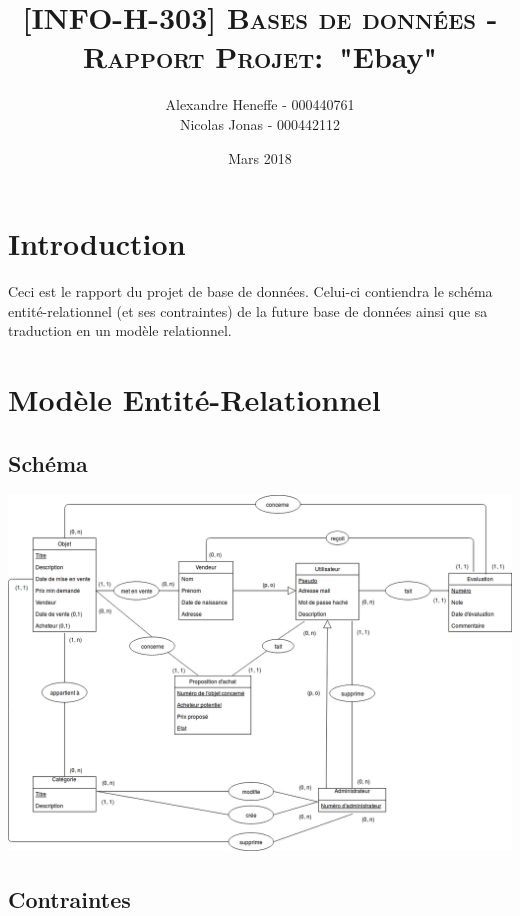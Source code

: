 \documentclass{article}
\title{\textsc{[INFO-H-303] Bases de données - Rapport Projet:}\
   "Ebay"}
\author{Alexandre Heneffe - 000440761\\
        Nicolas Jonas - 000442112}
\date{Mars 2018}
\begin{document}
\maketitle
\section{Introduction}

Ceci est le rapport du projet de base de données. Celui-ci contiendra le schéma entité-relationnel (et ses contraintes) de la future base de données ainsi que sa traduction en un modèle relationnel.

\section{Modèle Entité-Relationnel}

\subsection{Schéma}

\begin{center}
    \includegraphics[scale=0.45,left]{Rapport_partie1/schemaEA}
\end{center}

\newpage

\subsection{Contraintes}
\end{document}
